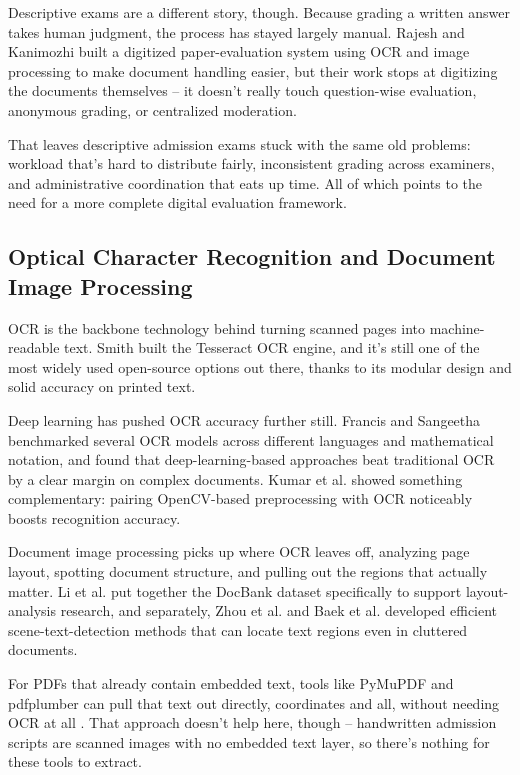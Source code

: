 Descriptive exams are a different story, though. Because grading a written answer takes human judgment, the process has stayed largely manual. Rajesh and Kanimozhi \cite{8878791} built a digitized paper-evaluation system using OCR and image processing to make document handling easier, but their work stops at digitizing the documents themselves -- it doesn't really touch question-wise evaluation, anonymous grading, or centralized moderation.

That leaves descriptive admission exams stuck with the same old problems: workload that's hard to distribute fairly, inconsistent grading across examiners, and administrative coordination that eats up time. All of which points to the need for a more complete digital evaluation framework.


\subsection{Optical Character Recognition and Document Image Processing}

OCR is the backbone technology behind turning scanned pages into machine-readable text. Smith \cite{4376991} built the Tesseract OCR engine, and it's still one of the most widely used open-source options out there, thanks to its modular design and solid accuracy on printed text.

Deep learning has pushed OCR accuracy further still. Francis and Sangeetha \cite{FRANCIS2025100532} benchmarked several OCR models across different languages and mathematical notation, and found that deep-learning-based approaches beat traditional OCR by a clear margin on complex documents. Kumar et al. \cite{inbook} showed something complementary: pairing OpenCV-based preprocessing with OCR noticeably boosts recognition accuracy.

Document image processing picks up where OCR leaves off, analyzing page layout, spotting document structure, and pulling out the regions that actually matter. Li et al. put together the DocBank dataset \cite{docbank2020} specifically to support layout-analysis research, and separately, Zhou et al. \cite{Zhou2017EASTAE} and Baek et al. \cite{8953846} developed efficient scene-text-detection methods that can locate text regions even in cluttered documents.

For PDFs that already contain embedded text, tools like PyMuPDF and pdfplumber can pull that text out directly, coordinates and all, without needing OCR at all \cite{10.1145/3696474.3696731}. That approach doesn't help here, though -- handwritten admission scripts are scanned images with no embedded text layer, so there's nothing for these tools to extract.


